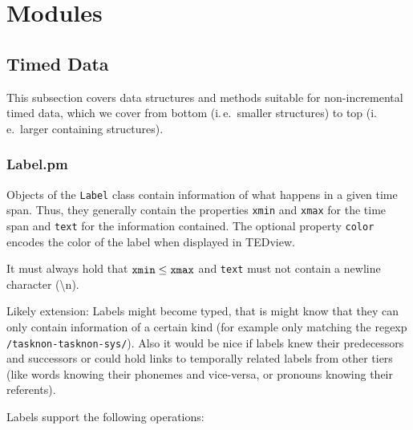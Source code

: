 \documentclass[a4,twoside=off,draft=true]{scrartcl}
\begin{document}
\section{Modules}

\subsection{Timed Data}

This subsection covers data structures and methods suitable for non-incremental timed data, which
we cover from bottom (i.\,e.\ smaller structures) to top (i.\,e.\ larger containing structures).

\subsubsection{Label.pm}

Objects of the {\tt Label} class contain information of what happens in a given time span.
Thus, they generally contain the properties {\tt xmin} and {\tt xmax} for the time span 
and {\tt text} for the information contained. The optional property {\tt color} encodes
the color of the label when displayed in TEDview.

It must always hold that ${\tt xmin} \leq {\tt xmax}$
and {\tt text} must not contain a newline character (\textbackslash{n}).

Likely extension: Labels might become typed, that is might know that they can only contain information of 
a certain kind (for example only matching the regexp {\tt /task\textpipe{}non-task\textpipe{}non-sys\textpipe{}/}).
Also it would be nice if labels knew their predecessors and successors or could hold links to temporally
related labels from other tiers (like words knowing their phonemes and vice-versa, or pronouns
knowing their referents).

Labels support the following operations:
\end{document}
